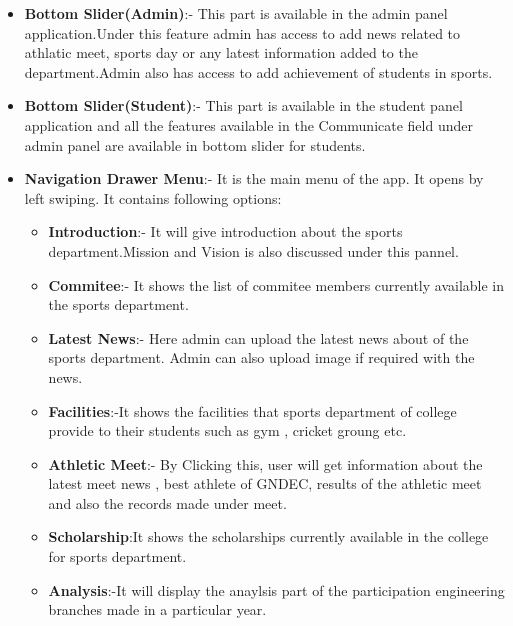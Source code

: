 	\begin{itemize}
		\item \textbf{Bottom Slider(Admin)}:- This part is available in the admin panel application.Under this feature admin has access to add news related to athlatic meet, sports day or any latest information added to the department.Admin also has access to add achievement of students in sports. 
		
		\item \textbf{Bottom Slider(Student)}:- This part is available in the student panel application and all the features available in the Communicate field under admin panel are available in bottom slider for students. 
				
		\item \textbf{Navigation Drawer Menu}:- It is the main menu of the app. It opens by left swiping. It contains following options:
		\begin{itemize}
			\item \textbf{Introduction}:- It will give introduction about the sports department.Mission and Vision is also discussed under this pannel.
			
			\item \textbf{Commitee}:- It shows the list of commitee members currently available in the sports department.
			
			\item \textbf{Latest News}:- Here admin can upload the latest news about of the sports department. Admin can also upload image if required with the news.
			
			\item \textbf{Facilities}:-It shows the facilities that sports department of college provide to their students such as gym , cricket groung etc.
			
			\item \textbf{Athletic Meet}:- By Clicking this, user will get information about the latest meet news , best athlete of GNDEC, results of the athletic meet and also the records made under meet.
			
			\item \textbf{Scholarship}:It shows the scholarships currently available in the college for sports department.
			
			\item \textbf{Analysis}:-It will display the anaylsis part of the participation engineering branches made in a particular year.
			

\end{itemize}
\end{itemize}
